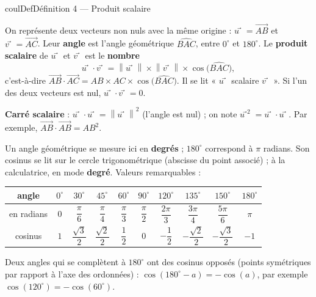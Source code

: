 \documentclass[11pt,a4paper]{article}
\makeatletter
\newcommand{\vect}[1]{\overrightarrow{#1}}
\newcommand{\norme}[1]{\left\lVert #1 \right\rVert}
\newcommand{\pt}[3]{\path (#1) node[croix]{} node[#2,font=\small,inner sep=2.5pt]{$#3$};}
\newcounter{lycee@signet}
\newcommand{\signet}[3][]{\stepcounter{lycee@signet}%
  \edef\lycee@dest{\if\relax\detokenize{#1}\relax
    signet.\arabic{lycee@signet}\else#1\fi}%
  \hypertarget{\lycee@dest}{}\bookmark[level=#2,dest=\lycee@dest]{#3}}
\def\vec#1{#1⃗}}%
\newenvironment{definitionbox}[1][Définition]%
  {\begin{boitecours}[phantom={\signet{2}{#1}}]{coulDef}{#1}}{\end{boitecours}}
\makeatother
\begin{document}
\begin{definitionbox}[Définition 4 --- Produit scalaire]
\begin{minipage}[t]{0.58\linewidth}\raggedright
On représente deux vecteurs non nuls avec la même origine : $\vec{u}=\vect{AB}$ et
$\vec{v}=\vect{AC}$. Leur \textbf{angle} est l'angle géométrique $\widehat{BAC}$, entre
$0^{\circ}$ et $180^{\circ}$. Le \textbf{produit scalaire} de $\vec{u}$ et $\vec{v}$ est le
\textbf{nombre}
\[
  \vec{u}\cdot\vec{v}=\norme{\vec{u}}\times\norme{\vec{v}}\times\cos\big(\widehat{BAC}\big),
\]
c'est-à-dire $\vect{AB}\cdot\vect{AC}=AB\times AC\times\cos\big(\widehat{BAC}\big)$. Il se lit
« $\vec{u}$ scalaire $\vec{v}$ ». Si l'un des deux vecteurs est nul,
$\vec{u}\cdot\vec{v}=0$.
\end{minipage}\hfill
\begin{minipage}[t]{0.38\linewidth}
\vspace{0pt}\centering
{}
\end{minipage}

\smallskip
\textbf{Carré scalaire} : $\vec{u}\cdot\vec{u}=\norme{\vec{u}}^{2}$ (l'angle est nul) ; on
note $\vec{u}^{2}=\vec{u}\cdot\vec{u}$. Par exemple, $\vect{AB}\cdot\vect{AB}=AB^{2}$.
\end{definitionbox}

\begin{remarquebox}
Un angle géométrique se mesure ici en \textbf{degrés} ; $180^{\circ}$ correspond à
$\pi$ radians. Son cosinus se lit sur le cercle trigonométrique (abscisse du point
associé) ; à la calculatrice, en mode \textbf{degré}. Valeurs remarquables :
\begin{center}
{\renewcommand{\arraystretch}{2.4}\setlength{\tabcolsep}{5pt}%
\begin{tabular}{|c|c|c|c|c|c|c|c|c|c|}
\hline
angle & $0^{\circ}$ & $30^{\circ}$ & $45^{\circ}$ & $60^{\circ}$ & $90^{\circ}$ &
$120^{\circ}$ & $135^{\circ}$ & $150^{\circ}$ & $180^{\circ}$\\
\hline
en radians & $0$ & $\dfrac{\pi}{6}$ & $\dfrac{\pi}{4}$ & $\dfrac{\pi}{3}$ & $\dfrac{\pi}{2}$ &
$\dfrac{2\pi}{3}$ & $\dfrac{3\pi}{4}$ & $\dfrac{5\pi}{6}$ & $\pi$\\
\hline
cosinus & $1$ & $\dfrac{\sqrt{3}}{2}$ & $\dfrac{\sqrt{2}}{2}$ & $\dfrac{1}{2}$ & $0$ &
$-\dfrac{1}{2}$ & $-\dfrac{\sqrt{2}}{2}$ & $-\dfrac{\sqrt{3}}{2}$ & $-1$\\
\hline
\end{tabular}}
\end{center}
Deux angles qui se complètent à $180^{\circ}$ ont des cosinus opposés (points
symétriques par rapport à l'axe des ordonnées) : $\cos(180^{\circ}-a)=-\cos(a)$, par
exemple $\cos(120^{\circ})=-\cos(60^{\circ})$.
\end{remarquebox}
\end{document}
